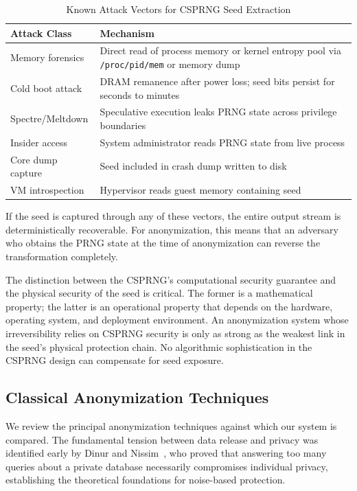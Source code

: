 \documentclass[journal]{IEEEtran}
\begin{document}
\begin{table}[t]
\caption{Known Attack Vectors for CSPRNG Seed Extraction}
\label{tab:prng_attacks}
\begin{center}
\begin{tabular}{@{}lp{4.8cm}@{}}
\toprule
\textbf{Attack Class} & \textbf{Mechanism} \\
\midrule
Memory forensics & Direct read of process memory or kernel entropy pool via \texttt{/proc/pid/mem} or memory dump \\
Cold boot attack & DRAM remanence after power loss; seed bits persist for seconds to minutes \\
Spectre/Meltdown & Speculative execution leaks PRNG state across privilege boundaries \\
Insider access & System administrator reads PRNG state from live process \\
Core dump capture & Seed included in crash dump written to disk \\
VM introspection & Hypervisor reads guest memory containing seed \\
\bottomrule
\end{tabular}
\end{center}
\end{table}

If the seed is captured through any of these vectors, the entire output stream is deterministically recoverable. For anonymization, this means that an adversary who obtains the PRNG state at the time of anonymization can reverse the transformation completely.

The distinction between the CSPRNG's computational security guarantee and the physical security of the seed is critical. The former is a mathematical property; the latter is an operational property that depends on the hardware, operating system, and deployment environment. An anonymization system whose irreversibility relies on CSPRNG security is only as strong as the weakest link in the seed's physical protection chain. No algorithmic sophistication in the CSPRNG design can compensate for seed exposure.

\subsection{Classical Anonymization Techniques}
\label{subsec:classical_anon}

We review the principal anonymization techniques against which our system is compared. The fundamental tension between data release and privacy was identified early by Dinur and Nissim~\cite{dinur2003revealing}, who proved that answering too many queries about a private database necessarily compromises individual privacy, establishing the theoretical foundations for noise-based protection.
\end{document}
